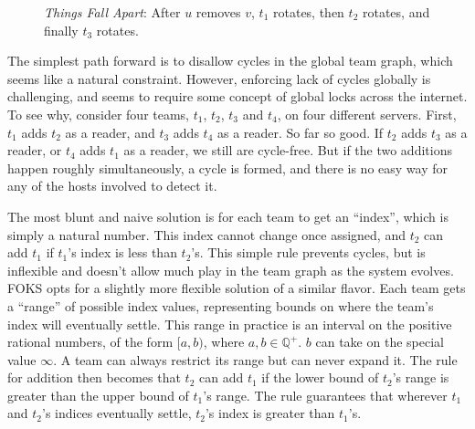\begin{figure}[ht]
    \centering
    \caption{\textit{Things Fall Apart}: After $u$ removes $v$, $t_1$ rotates, then $t_2$ rotates, and finally $t_3$ rotates.}
    \label{fig:cycle4}
\end{figure}

The simplest path forward is to disallow cycles in the global team
graph, which seems like a natural constraint. However, enforcing
lack of cycles globally is challenging, and seems to require some
concept of global locks across the internet. To see why, consider
four teams, $t_1$, $t_2$, $t_3$ and $t_4$, on four different servers.
First, $t_1$ adds $t_2$ as a reader, and $t_3$ adds $t_4$ as a reader.
So far so good. If $t_2$ adds $t_3$ as a reader, or $t_4$ adds
$t_1$ as a reader, we still are cycle-free.  But if the two additions
happen roughly simultaneously, a cycle is formed, and there is no easy
way for any of the hosts involved to detect it.

The most blunt and naive solution is for each team to get an ``index'', which
is simply a natural number. This index cannot change once assigned, and
$t_2$ can add $t_1$ if $t_1$'s index is less than $t_2$'s. This simple
rule prevents cycles, but is inflexible and doesn't allow much play in the team
graph as the system evolves. FOKS opts for a slightly more flexible solution of
a similar flavor. Each team gets a ``range'' of possible index values,
representing bounds on where the team's index will eventually settle.  This
range in practice is an interval on the positive rational numbers, of the form
$[a,b)$, where $a,b \in \mathbb{Q^{+}}$. $b$ can take on the special value $\infty$.
A team can always restrict its range but can never expand it. The rule for
addition then becomes that $t_2$ can add $t_1$ if the lower bound of $t_2$'s
range is greater than the upper bound of $t_1$'s range. The rule guarantees that
wherever $t_1$ and $t_2$'s indices eventually settle, $t_2$'s index is greater
than $t_1$'s.

